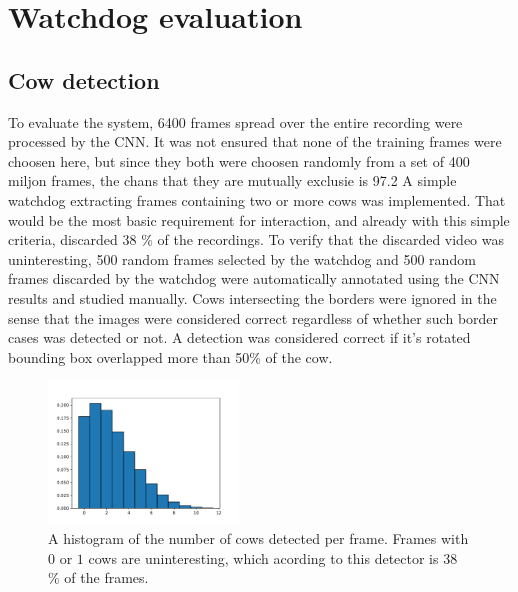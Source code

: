 \documentclass{cta-author}
\begin{document}
\section{Watchdog evaluation}
\subsection{Cow detection}
\label{sec:num}
To evaluate the system, 6400 frames spread over the entire recording were processed by the CNN. 
It was not ensured that none of the training frames were choosen here, but since they both were choosen randomly from a set of 400 miljon frames, the chans that they are mutually exclusie is 97.2%
A simple watchdog extracting frames containing two or more cows was implemented. That would be the most basic requirement for interaction, and already with this simple criteria, discarded 38 \% of the recordings. To verify that the discarded video was uninteresting, 500 random frames selected by the watchdog and 500 random frames discarded by the watchdog were automatically annotated using the CNN results and studied manually. Cows intersecting the borders were ignored in the sense that the images were considered correct regardless of whether such border cases was detected or not. A detection was considered correct if it's rotated bounding box overlapped more than 50\% of the cow.

\begin{figure}[tb]
\begin{center}
  \includegraphics[width=0.45\textwidth]{cow_nbr_hist.pdf}
\end{center}
  \caption{A histogram of the number of cows detected per frame. Frames with $0$ or $1$ cows are uninteresting, which acording to this detector is 38 \% of the frames.}
  \label{fig:cowhist}
\end{figure}
\end{document}
